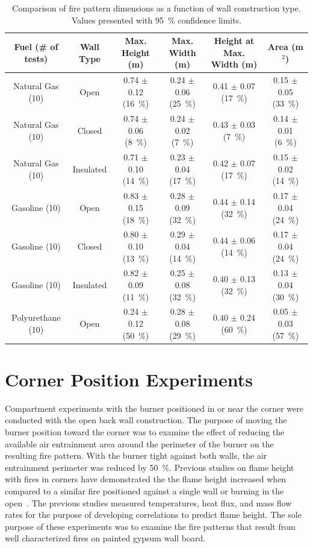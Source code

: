 \documentclass[twoside]{uocthesis}
\begin{document}
{\begin{table}
	\centering
	\footnotesize
	\begin{tabular}{|c|c|c|c|c|c|}
	\hline
	Fuel (\# of tests)      &   Wall Type   &   Max. Height (m)	         & Max. Width (m)               &  Height at Max. Width (m) &  Area (m$^2$)  \\ \hline \hline
		Natural Gas (10)    &   Open 		& 0.74 	$\pm$ 0.12 (16~\%)   &	0.24 $\pm$ 0.06 (25~\%) 	& 0.41 $\pm$ 0.07 (17~\%)	& 0.15 $\pm$ 0.05 (33~\%) 	\\
		Natural Gas (10)    &   Closed 		& 0.74	$\pm$ 0.06 (8~\%)    &	0.24 $\pm$ 0.02 (7~\%) 		& 0.43 $\pm$ 0.03 (7~\%)  	& 0.14 $\pm$ 0.01 (6~\%) 	\\
		Natural Gas (10)    &   Insulated 	& 0.71	$\pm$ 0.10 (14~\%)   &	0.23 $\pm$ 0.04 (17~\%) 	& 0.42 $\pm$ 0.07 (17~\%) 	& 0.15 $\pm$ 0.02 (14~\%)  	\\
		Gasoline (10)       &   Open    	& 0.83	$\pm$ 0.15 (18~\%)   &	0.28 $\pm$ 0.09 (32~\%) 	& 0.44 $\pm$ 0.14 (32~\%) 	& 0.17 $\pm$ 0.04 (24~\%)  	\\
		Gasoline (10)       &   Closed  	& 0.80	$\pm$ 0.10 (13~\%)   &	0.29 $\pm$ 0.04 (14~\%) 	& 0.44 $\pm$ 0.06 (14~\%) 	& 0.17 $\pm$ 0.04 (24~\%)  	\\
		Gasoline (10)       &   Insulated	& 0.82 	$\pm$ 0.09 (11~\%)   &	0.25 $\pm$ 0.08 (32~\%) 	& 0.40 $\pm$ 0.13 (32~\%) 	& 0.13 $\pm$ 0.04 (30~\%)  	\\
		Polyurethane (10)	&   Open 		& 0.24  $\pm$ 0.12 (50~\%) 	 &  0.28 $\pm$ 0.08 (29~\%) 	& 0.40 $\pm$ 0.24 (60~\%)   & 0.05 $\pm$ 0.03 (57~\%)   \\
		\hline
	\end{tabular}
	\caption[Comparison of fire pattern dimensions as a function of wall construction type]{Comparison of fire pattern dimensions as a function of wall construction type. Values presented with 95~\% confidence limits.}
	\label{tab:Fire_Pattern_Dimensions_Wall_Construction}
\end{table}

\section{Corner Position Experiments}

Compartment experiments with the burner positioned in or near the corner were conducted with the open back wall construction.  The purpose of moving the burner position toward the corner was to examine the effect of reducing the available air entrainment area around the perimeter of the burner on the resulting fire pattern.  With the burner tight against both walls, the air entrainment perimeter was reduced by 50~\%. Previous studies on flame height with fires in corners have demonstrated the the flame height increased when compared to a similar fire positioned against a single wall or burning in the open~\cite{Poreh:1999,Saito:1993,Takahashi:1997,Kokkala:1993}.  The previous studies measured temperatures, heat flux, and mass flow rates for the purpose of developing correlations to predict flame height. The sole purpose of these experiments was to examine the fire patterns that result from well characterized fires on painted gypsum wall board.       

}
\end{document}
